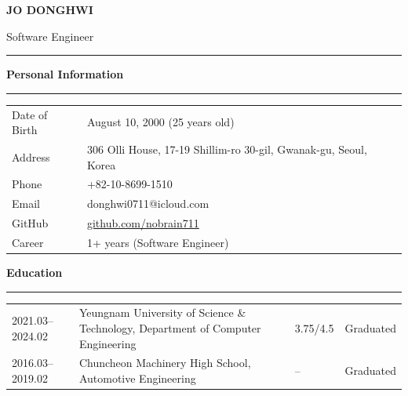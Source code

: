 \documentclass[a4paper, 10pt]{article}
\newcommand{\resumesection}[1]{%
  \vspace{8pt}
  \noindent
  {\large\bfseries #1}
  \vspace{2pt}
  \noindent\hrule
  \vspace{4pt}
}
\begin{document}

\begin{minipage}[t]{\textwidth}
  \vspace{0pt}
  {\fontsize{32}{32}\selectfont\textbf{JO DONGHWI}}

  \vspace{2pt}

  {\large Software Engineer}

  \vspace{4pt}
  \noindent\hrule
  \vspace{6pt}
\end{minipage}


\resumesection{Personal Information}

\begin{tabularx}{\textwidth}{l X}
  Date of Birth & August 10, 2000 (25 years old) \\
  Address & 306 Olli House, 17-19 Shillim-ro 30-gil, Gwanak-gu, Seoul, Korea \\
  Phone & +82-10-8699-1510 \\
  Email & donghwi0711@icloud.com \\
  GitHub & \href{https://github.com/nobrain711}{github.com/nobrain711} \\
  Career & 1+ years (Software Engineer) \\
\end{tabularx}


\resumesection{Education}

\noindent
\begin{tabularx}{\textwidth}{l X l l}
  2021.03--2024.02 & Yeungnam University of Science \& Technology, Department of Computer Engineering & 3.75/4.5 & Graduated \\
  2016.03--2019.02 & Chuncheon Machinery High School, Automotive Engineering & -- & Graduated \\
\end{tabularx}
\end{document}
